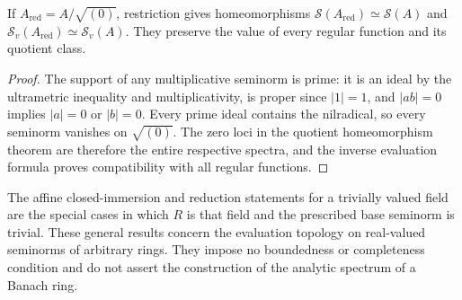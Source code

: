 \begin{theorem}\label{spectrum:reduction-homeomorphism}
\leanok
{}
If $A_{\mathrm{red}}=A/\sqrt{(0)}$, restriction gives homeomorphisms
$\mathcal S(A_{\mathrm{red}})\simeq\mathcal S(A)$ and
$\mathcal S_v(A_{\mathrm{red}})\simeq\mathcal S_v(A)$.
They preserve the value of every regular function and its quotient class.
\end{theorem}
\begin{proof}
The support of any multiplicative seminorm is prime: it is an ideal by the
ultrametric inequality and multiplicativity, is proper since $|1|=1$, and
$|ab|=0$ implies $|a|=0$ or $|b|=0$. Every prime ideal contains the nilradical,
so every seminorm vanishes on $\sqrt{(0)}$. The zero loci in the quotient
homeomorphism theorem are therefore the entire respective spectra, and the
inverse evaluation formula proves compatibility with all regular functions.
\end{proof}

\begin{remark}\label{spectrum:quotient-specialization}
The affine closed-immersion and reduction statements for a trivially valued field
are the special cases in which $R$ is that field and the prescribed base seminorm
is trivial. These general results concern the evaluation topology on real-valued
seminorms of arbitrary rings. They impose no boundedness or completeness condition
and do not assert the construction of the analytic spectrum of a Banach ring.
\end{remark}
